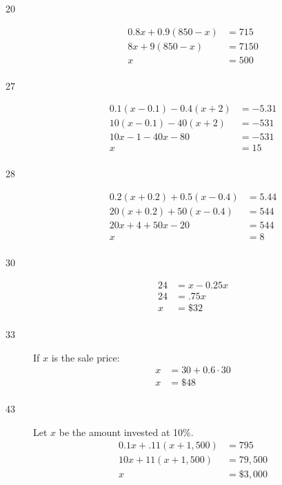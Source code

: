 \documentclass[letterpaper, landscape]{exam}
\begin{document}
\begin{description}
      \item[20]
        \begin{align*}
          0.8x + 0.9 (850 - x) & = 715 \\
          8x + 9(850 - x)      & = 7150 \\
          x                    & = \boxed{ 500 } \\
        \end{align*}

      \item[27]
        \begin{align*}
          0.1 (x - 0.1) - 0.4(x + 2) & = -5.31 \\
          10(x - 0.1) - 40(x + 2)    & = -531 \\
          10x - 1 - 40x - 80         & = -531 \\
          x                          & = \boxed{ 15 } \\
        \end{align*}

      \item[28]
        \begin{align*}
          0.2(x + 0.2) + 0.5(x - 0.4) & = 5.44 \\
          20(x + 0.2) + 50(x - 0.4)   & = 544 \\
          20x + 4 + 50x - 20          & = 544 \\
          x                           & = \boxed{ 8 } \\
        \end{align*}

      \item[30]
        \begin{align*}
          24 & = x - 0.25x \\
          24 & = .75x \\
          x  & = \boxed{ \$32 } \\
        \end{align*}

      \item[33] 
        If $x$ is the sale price:
        \begin{align*}
          x & = 30 + 0.6 \cdot 30 \\
          x & = \boxed{ \$48 } \\
        \end{align*}

      \item[43] Let $x$ be the amount invested at 10\%.
        \begin{align*}
          0.1x + .11(x + 1,500) & = 795 \\
          10x + 11(x + 1,500)   & = 79,500 \\
          x                    & = \boxed{ \$3,000 } \\
        \end{align*}

      \end{description}
\end{document}
